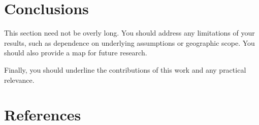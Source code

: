\documentclass[
  letterpaper,
  authoryear]{elsarticle}
\begin{document}

\section{Conclusions}\label{conclusions}

This section need not be overly long. You should address any limitations
of your results, such as dependence on underlying assumptions or
geographic scope. You should also provide a map for future research.

Finally, you should underline the contributions of this work and any
practical relevance.


\section*{References}\label{references}


\renewcommand{\bibsection}{}

\end{document}
